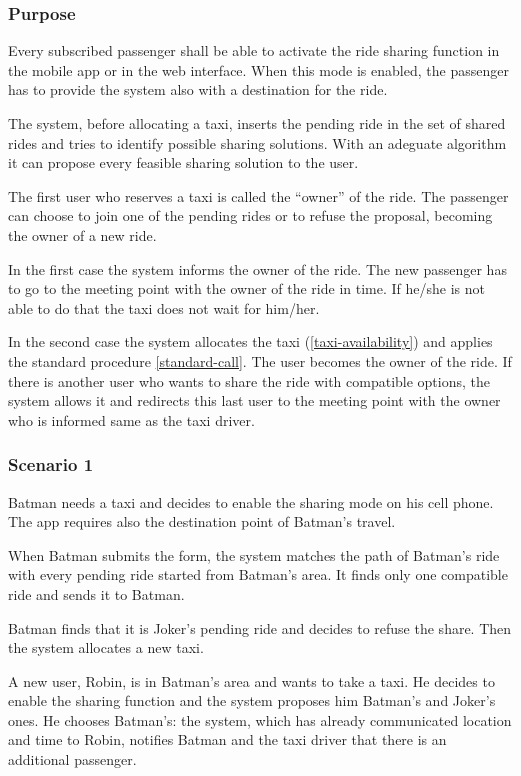 \label{ride-sharing}
\subsubsection{Purpose}

Every subscribed passenger shall be able to activate the ride sharing function in the mobile app or in the web interface. When this mode is enabled, the passenger has to provide the system also with a destination for the ride.

The system, before allocating a taxi, inserts the pending ride in the set of shared rides and tries to identify possible sharing solutions.
With an adeguate algorithm it can propose every feasible sharing solution to the user.

The first user who reserves a taxi is called the ``owner'' of the ride.
The passenger can choose to join one of the pending rides or to refuse the proposal, becoming the owner of a new ride.

In the first case the system informs the owner of the ride. The new passenger has to go to the meeting point with the owner of the ride in time. If he/she is not able to do that the taxi does not wait for him/her.

In the second case the system allocates the taxi (\ref{taxi-availability}) and applies the standard procedure \ref{standard-call}.  The user becomes the owner of the ride.
If there is another user who wants to share the ride with compatible options, the system allows it and redirects this last user to the meeting point with the owner who is informed same as the taxi driver.

\subsubsection{Scenario 1}
Batman needs a taxi and decides to enable the sharing mode on his cell phone. The app requires also the destination point of Batman's travel.

When Batman submits the form, the system matches the path of Batman's ride with every pending ride started from Batman's area. It finds only one compatible ride and sends it to Batman.

Batman finds that it is Joker's pending ride and decides to refuse the share. Then the system allocates a new taxi.

A new user, Robin, is in Batman's area and wants to take a taxi. He decides to enable the sharing function and the system proposes him Batman's and Joker's ones. He chooses Batman's: the system, which has already communicated location and time to Robin, notifies Batman and the taxi driver that there is an additional passenger.

